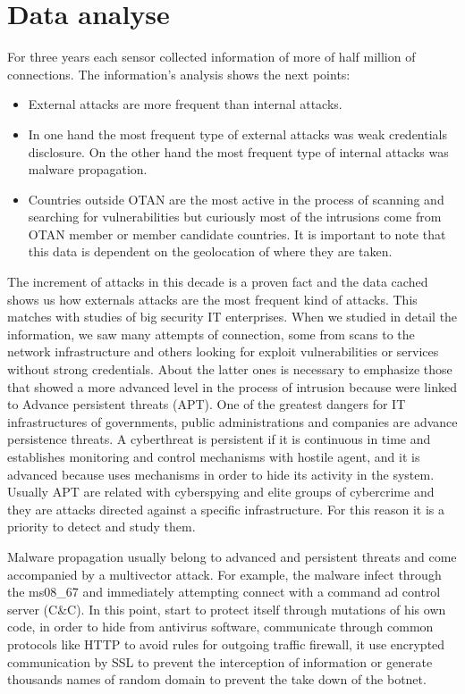 \documentclass[a4paper]{llncs}
\begin{document}
	\section{Data analyse}
	For three years each sensor collected information of more of half million of connections. The information's analysis shows the next points:
	\begin{itemize}
		\item External attacks are more frequent than internal attacks.
		\item In one hand the most frequent type of external attacks was weak credentials disclosure. On the other hand the most frequent type of internal attacks was malware propagation.
		\item Countries outside OTAN are the most active in the process of scanning and searching for vulnerabilities but curiously most of the intrusions come from OTAN member or member candidate countries. It is important to note that this data is dependent on the geolocation of where they are taken.
	\end{itemize}
	
	The increment of attacks in this decade is a proven fact and the data cached shows us how externals attacks are the most frequent kind of attacks. This matches with studies of big security IT enterprises\cite{verizon-2015}. When we studied in detail the information, we saw many attempts of connection, some from scans to the network infrastructure and others looking for exploit vulnerabilities or services without strong credentials. About the latter ones is necessary to emphasize those that showed a more advanced level in the process of intrusion because were linked to Advance persistent threats (APT). One of the greatest dangers for IT infrastructures of governments, public administrations and companies are advance persistence threats. A cyberthreat is persistent if it is continuous in time and establishes monitoring and control mechanisms with hostile agent, and it is advanced because uses mechanisms in order to hide its activity in the system. Usually APT are related with cyberspying and elite groups of cybercrime and they are attacks directed against a specific infrastructure. For this reason it is a priority to detect and study them.
	
	Malware propagation usually belong to advanced and persistent threats and come accompanied by a multivector attack. For example, the malware infect through the ms08\_67 and immediately attempting connect with a command ad control server (C\&C). In this point, start to protect itself through mutations of his own code, in order to hide from antivirus software, communicate through common protocols like HTTP to avoid rules for outgoing traffic firewall, it use encrypted communication by SSL to prevent the interception of information or generate thousands names of random domain to prevent the take down of the botnet.
	
\end{document}
